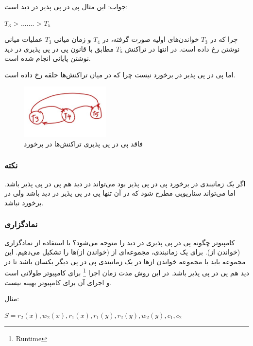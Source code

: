 جواب: این مثال پی در پی پذیر در دید است:

\begin{LTR}
    $T_{3}$ > ....... > $T_{5}$
\end{LTR}

چرا که در $T_{3}$ خواندن‌های اولیه صورت گرفته، در $T_{4}$ و زمان میانی $T_{3}$
عملیات میانی نوشتن رخ داده است. در انتها در تراکنش $T_{5}$ مطابق با قانون پی در
پی پذیری در دید نوشتن پایانی انجام شده است.

اما پی در پی پذیر در برخورد نیست چرا که در میان تراکنش‌ها حلقه رخ داده است.

\begin{figure}[H]
    \centering
    \caption{فاقد پی در پی پذیری تراکنش‌ها در برخورد}
    \includegraphics[width=0.4\textwidth]{umls/vsr_exp_2.jpg}
\end{figure}

\subsubsection*{نکته}

اگر یک زمانبندی در برخورد پی در پی پذیر بود می‌تواند در دید هم پی در پی پذیر
باشد. اما می‌تواند سناریویی مطرح شود که در آن تنها پی در پی پذیر در دید باشد ولی
در برخورد نباشد.

\subsubsection{نمادگزاری}

کامپیوتر چگونه پی در پی پذیری در دید را متوجه می‌شود؟ با استفاده از نمادگزاری
(خواندن از). برای یک زمانبندی، مجموعه‌ای از (خواندن از‌)ها را تشکیل می‌دهیم. این
مجموعه باید با مجموعه خواندن از‌ها در یک زمانبندی پی در پی دیگر یکسان باشد تا در
دید هم پی در پی پذیر باشد. در این روش مدت زمان اجرا \footnote{Runtime} برای
کامپیوتر طولانی است و اجرای آن برای کامپیوتر بهینه نیست.

مثال:

\begin{LTR}
$S = r_{2}(x), w_{2}(x), r_{1}(x), r_{1}(y), r_{2}(y), w_{2}(y), c_{1}, c_{2} $
\end{LTR}

